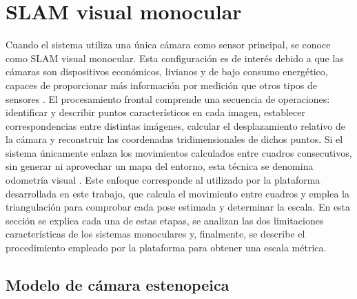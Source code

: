\section{SLAM visual monocular}
\label{sec:slam-monocular}

Cuando el sistema utiliza una única cámara como sensor principal, se conoce como SLAM visual monocular.
Esta configuración es de interés debido a que las cámaras son dispositivos económicos, livianos y de bajo consumo energético, capaces de proporcionar más información por medición que otros tipos de sensores \cite{scaramuzza2011vo}.
El procesamiento frontal comprende una secuencia de operaciones: identificar y describir puntos característicos en cada imagen, establecer correspondencias entre distintas imágenes, calcular el desplazamiento relativo de la cámara y reconstruir las coordenadas tridimensionales de dichos puntos.
Si el sistema únicamente enlaza los movimientos calculados entre cuadros consecutivos, sin generar ni aprovechar un mapa del entorno, esta técnica se denomina odometría visual \cite{scaramuzza2011vo}.
Este enfoque corresponde al utilizado por la plataforma desarrollada en este trabajo, que calcula el movimiento entre cuadros y emplea la triangulación para comprobar cada pose estimada y determinar la escala.
En esta sección se explica cada una de estas etapas, se analizan las dos limitaciones características de los sistemas monoculares y, finalmente, se describe el procedimiento empleado por la plataforma para obtener una escala métrica.

\subsection{Modelo de cámara estenopeica}

